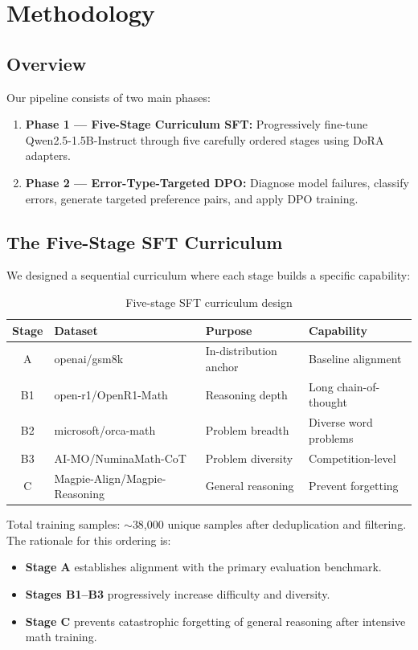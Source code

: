 \documentclass{article}
\begin{document}
\section{Methodology}

\subsection{Overview}
Our pipeline consists of two main phases:
\begin{enumerate}[noitemsep]
    \item \textbf{Phase 1 --- Five-Stage Curriculum SFT:} Progressively fine-tune Qwen2.5-1.5B-Instruct through five carefully ordered stages using DoRA adapters.
    \item \textbf{Phase 2 --- Error-Type-Targeted DPO:} Diagnose model failures, classify errors, generate targeted preference pairs, and apply DPO training.
\end{enumerate}

\subsection{The Five-Stage SFT Curriculum}

We designed a sequential curriculum where each stage builds a specific capability:

\begin{table}[H]
\centering
\caption{Five-stage SFT curriculum design}
\begin{tabular}{clll}
\toprule
\textbf{Stage} & \textbf{Dataset} & \textbf{Purpose} & \textbf{Capability} \\
\midrule
A & openai/gsm8k & In-distribution anchor & Baseline alignment \\
B1 & open-r1/OpenR1-Math & Reasoning depth & Long chain-of-thought \\
B2 & microsoft/orca-math & Problem breadth & Diverse word problems \\
B3 & AI-MO/NuminaMath-CoT & Problem diversity & Competition-level \\
C & Magpie-Align/Magpie-Reasoning & General reasoning & Prevent forgetting \\
\bottomrule
\end{tabular}
\end{table}

Total training samples: $\sim$38,000 unique samples after deduplication and filtering. The rationale for this ordering is:
\begin{itemize}[noitemsep]
    \item \textbf{Stage A} establishes alignment with the primary evaluation benchmark.
    \item \textbf{Stages B1--B3} progressively increase difficulty and diversity.
    \item \textbf{Stage C} prevents catastrophic forgetting of general reasoning after intensive math training.
\end{itemize}
\end{document}
